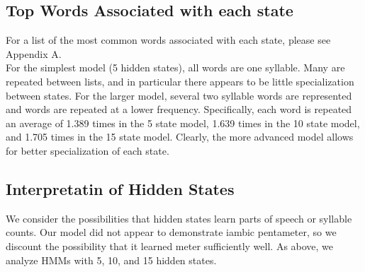\subsection{Top Words Associated with each state}
For a list of the most common words associated with each state, please see Appendix A.\\

For the simplest model (5 hidden states), all words are one syllable. Many are repeated between lists, and in particular there appears to be little specialization between states. For the larger model, several two syllable words are represented and words are repeated at a lower frequency. Specifically, each word is repeated an average of 1.389 times in the 5 state model, 1.639 times in the 10 state model, and 1.705 times in the 15 state model. Clearly, the more advanced model allows for better specialization of each state.

\subsection{Interpretatin of Hidden States}
We consider the possibilities that hidden states learn parts of speech or syllable counts. Our model did not appear to demonstrate iambic pentameter, so we discount the possibility that it learned meter sufficiently well. As above, we analyze HMMs with 5, 10, and 15 hidden states.

